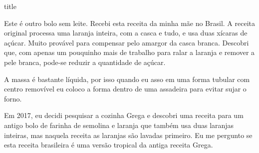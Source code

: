 \documentclass [11pt, letterpaper] {article}
\begin{document}
 {title}

Este é outro bolo sem leite. Recebi esta receita da minha mãe no
Brasil. A receita original processa uma laranja inteira, com a casca e
tudo, e usa duas xícaras de açúcar. Muito provável para compensar pelo
amargor da casca branca. Descobri que, com apenas um pouquinho mais de
trabalho para ralar a laranja e remover a pele branca, pode-se reduzir a quantidade de açúcar.

A massa é bastante líquida, por isso quando eu asso em uma forma tubular com
centro removível eu coloco a forma dentro de uma assadeira para evitar sujar o forno.

Em 2017, eu decidi pesquisar a cozinha Grega e descobri uma receita
para um antigo bolo de farinha de semolina e laranja que também usa
duas laranjas inteiras, mas naquela receita as laranjas s\~ao lavadas primeiro. Eu me pergunto se esta receita brasileira é uma versão tropical da antiga receita Grega.
\end{document}
